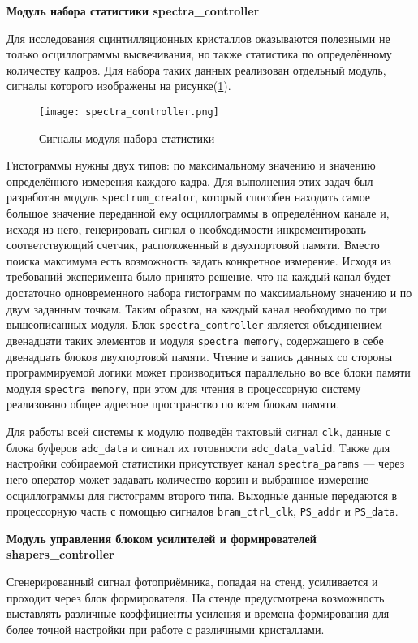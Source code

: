 \textbf{Модуль набора статистики spectra\_controller}\par
Для исследования сцинтилляционных кристаллов оказываются полезными не только осциллограммы высвечивания, но также статистика по определённому количеству кадров. Для набора таких данных реализован отдельный модуль, сигналы которого изображены на рисунке(\ref{fig:spectra_controller}).\par
\begin{figure}[ht]
    \centering
    \texttt{[image: spectra\_controller.png]}
    \caption{Сигналы модуля набора статистики}
    \label{fig:spectra_controller}
\end{figure}
Гистограммы нужны двух типов: по максимальному значению и значению определённого измерения каждого кадра. Для выполнения этих задач был разработан модуль \texttt{spectrum\_creator}, который способен находить самое большое значение переданной ему осциллограммы в определённом канале и, исходя из него, генерировать сигнал о необходимости инкрементировать соответствующий счетчик, расположенный в двухпортовой памяти. Вместо поиска максимума есть возможность задать конкретное измерение. Исходя из требований эксперимента было принято решение, что на каждый канал будет достаточно одновременного набора гистограмм по максимальному значению и по двум заданным точкам. Таким образом, на каждый канал необходимо по три вышеописанных модуля. Блок \texttt{spectra\_controller} является объединением двенадцати таких элементов и модуля \texttt{spectra\_memory}, содержащего в себе двенадцать блоков двухпортовой памяти. Чтение и запись данных со стороны программируемой логики может производиться параллельно во все блоки памяти модуля \texttt{spectra\_memory}, при этом для чтения в процессорную систему реализовано общее адресное пространство по всем блокам памяти.\par
Для работы всей системы к модулю подведён тактовый сигнал \texttt{clk}, данные с блока буферов \texttt{adc\_data} и сигнал их готовности \texttt{adc\_data\_valid}. Также для настройки собираемой статистики присутствует канал \texttt{spectra\_params} --- через него оператор может задавать количество корзин и выбранное измерение осциллограммы для гистограмм второго типа. Выходные данные передаются в процессорную часть с помощью сигналов \texttt{bram\_ctrl\_clk}, \texttt{PS\_addr} и \texttt{PS\_data}.\par
\textbf{Модуль управления блоком усилителей и формирователей shapers\_controller}\par
Сгенерированный сигнал фотоприёмника, попадая на стенд, усиливается и проходит через блок формирователя. На стенде предусмотрена возможность выставлять различные коэффициенты усиления и времена формирования для более точной настройки при работе с различными кристаллами.\par
